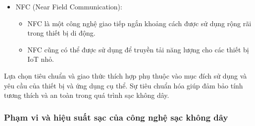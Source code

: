 \documentclass{article} %
\begin{document}
\begin{itemize}
\begin{itemize}
    \item Sạc Bluetooth có thể được sử dụng để sạc các thiết bị như tai nghe không dây và các thiết bị IoT khác.
    \end{itemize}
\item NFC (Near Field Communication):
    \begin{itemize}
        \item NFC là một công nghệ giao tiếp ngắn khoảng cách được sử dụng rộng rãi trong thiết bị di động.
    \item NFC cũng có thể được sử dụng để truyền tải năng lượng cho các thiết bị IoT nhỏ.
    \end{itemize}
\end{itemize}

Lựa chọn tiêu chuẩn và giao thức thích hợp phụ thuộc vào mục đích sử dụng và yêu cầu của thiết bị và ứng dụng cụ thể. Sự tiêu chuẩn hóa giúp đảm bảo tính tương thích và an toàn trong quá trình sạc không dây.

\subsubsection{Phạm vi và hiệu suất sạc của công nghệ sạc không dây}
\end{document}
